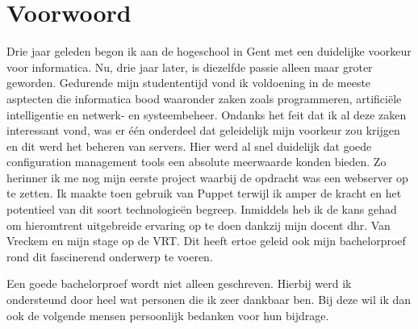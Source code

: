 
\chapter*{Voorwoord}
\label{ch:voorwoord}


Drie jaar geleden begon ik aan de hogeschool in Gent met een duidelijke voorkeur voor informatica. Nu, drie jaar later, is diezelfde passie alleen maar groter geworden. Gedurende mijn studententijd vond ik voldoening in de meeste asptecten die informatica bood waaronder zaken zoals programmeren, artifici\"ele intelligentie en netwerk- en systeembeheer. Ondanks het feit dat ik al deze zaken interessant vond, was er \'e\'en onderdeel dat geleidelijk mijn voorkeur zou krijgen en dit werd het beheren van servers.
 \newline
Hier werd al snel duidelijk dat goede configuration management tools een absolute meerwaarde konden bieden. Zo herinner ik me nog mijn eerste project waarbij de opdracht was een webserver op te zetten. Ik maakte toen gebruik van Puppet terwijl ik amper de kracht en het potentieel van dit soort technologie\"en begreep. Inmiddels heb ik de kans gehad om hieromtrent uitgebreide ervaring op te doen dankzij mijn docent dhr. Van Vreckem en mijn stage op de VRT. Dit heeft ertoe geleid ook mijn bachelorproef rond dit fascinerend onderwerp te voeren.

Een goede bachelorproef wordt niet alleen geschreven. Hierbij werd ik ondersteund door heel wat personen die ik zeer dankbaar ben. Bij deze wil ik dan ook de volgende mensen persoonlijk bedanken voor hun bijdrage.

